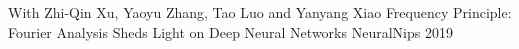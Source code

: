 

\begin{cvhonors}

  \cvhonor
    {With Zhi-Qin Xu, Yaoyu Zhang, Tao Luo and Yanyang Xiao} %
    {Frequency Principle: Fourier Analysis Sheds Light on Deep Neural Networks} %
    {NeuralNips} %
    {2019} %

\end{cvhonors}